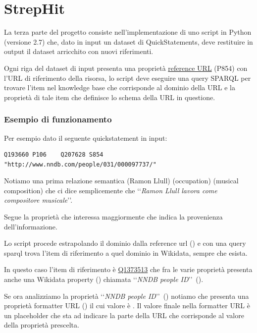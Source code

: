 \chapter{StrepHit}
\label{cha:strephit}
La terza parte del progetto consiste nell'implementazione di uno script in Python (versione 2.7) che, dato in input un dataset di QuickStatements, deve restituire in output il dataset
arricchito con nuovi riferimenti.

Ogni riga del dataset di input presenta una proprietà \href{https://www.wikidata.org/wiki/Property:P854}{reference URL} (P854) con l'URL di riferimento della risorsa, lo 
script deve eseguire una query SPARQL per trovare l'item nel knowledge base che corrisponde al dominio della URL e la proprietà di tale item che definisce lo schema della URL in questione.

\subsection{Esempio di funzionamento}
Per esempio dato il seguente quickstatement in input:
\begin{lstlisting}[style=QuickstatementsStyle, caption=Riga del dump]
    Q193660	P106	Q207628	S854	"http://www.nndb.com/people/031/000097737/"
\end{lstlisting}

Notiamo una prima relazione semantica 
\href{https://www.wikidata.org/wiki/Q193660}{} (Ramon Llull) \href{https://www.wikidata.org/wiki/Property:P106}{} (occupation) 
\href{https://www.wikidata.org/wiki/Q207628}{} (musical composition) 
che ci dice semplicemente che \lq\lq \textit{Ramon Llull lavora come compositore musicale}\rq\rq .

Segue la proprietà che interessa maggiormente  che indica la provenienza dell'informazione. 

Lo script procede estrapolando il dominio dalla reference url () e con una query sparql trova l'item di riferimento a quel dominio in Wikidata, sempre che esista.

In questo caso l'item di riferimento è \href{https://www.wikidata.org/wiki/Q1373513}{Q1373513} che fra le varie proprietà presenta anche una Wikidata property () chiamata  
\lq\lq \textit{NNDB people ID}\rq\rq\ ().

Se ora analizziamo la proprietà \lq\lq \textit{NNDB people ID}\rq\rq\ () notiamo che presenta una proprietà formatter URL () il cui valore è . 
Il valore finale  nella formatter URL è un placeholder che sta ad indicare la parte della URL che corrisponde al valore della proprietà prescelta. 

